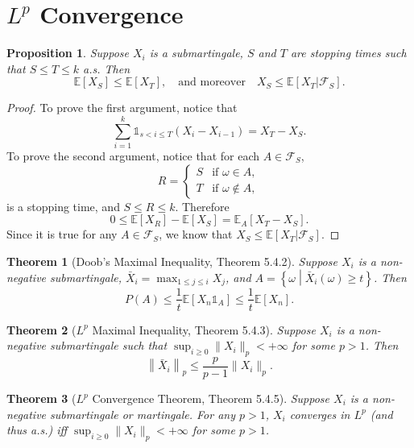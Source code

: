 \documentclass[openany]{book}
\newtheorem{proposition}{Proposition}[chapter]
\newtheorem{theorem}{Theorem}[chapter]
\theoremstyle{definition}
\theoremstyle{remark}
\begin{document}
\section{$L^p$ Convergence}
\begin{proposition}\label{prop:boundedOptStop}
    Suppose $X_i$ is a submartingale, $S$ and $T$ are stopping times such that $S\le T\le k$ a.s. Then
    \begin{equation*}
        \mathbb{E}[X_S]\le \mathbb{E}[X_T],\quad\textrm{and moreover}\quad X_S\le \mathbb{E}[X_T|\mathcal{F}_S].
    \end{equation*}
\end{proposition}
\begin{proof}
    To prove the first argument, notice that
    \begin{equation*}
        \sum_{i=1}^{k}\mathds{1}_{s<i\le T}(X_i-X_{i-1})=X_T-X_S.
    \end{equation*}
    To prove the second argument, notice that for each $A\in \mathcal{F}_S$,
    \begin{equation*}
        R=\left\{
        \begin{array}{ll}
            S & \textrm{if }\omega\in A, \\
            T & \textrm{if }\omega\not\in A,
        \end{array}
        \right.
    \end{equation*}
    is a stopping time, and $S\le R\le k$. Therefore
    \begin{equation*}
        0\le \mathbb{E}[X_R]-\mathbb{E}[X_S]=\mathbb{E}_A[X_T-X_S].
    \end{equation*}
    Since it is true for any $A\in \mathcal{F}_S$, we know that $X_S\le \mathbb{E}[X_T|\mathcal{F}_S]$.
\end{proof}
\begin{theorem}[Doob's Maximal Inequality, \cite{D10} Theorem 5.4.2]
    Suppose $X_i$ is a non-negative submartingale, $\bar{X}_i=\max_{1\le j\le i}X_j$, and $A=\left\{\omega\middle|\bar{X}_i(\omega)\ge t\right\}$. Then
    \begin{equation*}
        P(A)\le \frac{1}{t}\mathbb{E}[X_n\mathds{1}_A]\le \frac{1}{t}\mathbb{E}[X_n].
    \end{equation*}
\end{theorem}
\begin{theorem}[$L^p$ Maximal Inequality, \cite{D10} Theorem 5.4.3]
    Suppose $X_i$ is a non-negative submartingale such that $\sup_{i\ge0}\|X_i\|_p<+\infty$ for some $p>1$. Then
    \begin{equation*}
        \left\|\bar{X}_i\right\|_p\le \frac{p}{p-1}\|X_i\|_p.
    \end{equation*}
\end{theorem}
\begin{theorem}[$L^p$ Convergence Theorem, \cite{D10} Theorem 5.4.5]
    Suppose $X_i$ is a non-negative submartingale or martingale. For any $p>1$, $X_i$ converges in $L^p$ (and thus a.s.) iff $\sup_{i\ge0}\|X_i\|_p<+\infty$ for some $p>1$.
\end{theorem}
\end{document}

